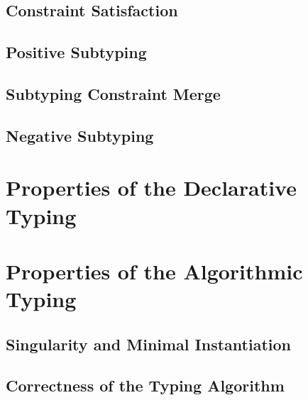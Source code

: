 \documentclass[acmsmall,natbib=false,review,anonymous]{acmart}
\newcommand{\genDir}{_gen}
\begin{document}
\subsection{Constraint Satisfaction}


\subsection{Positive Subtyping}


\subsection{Subtyping Constraint Merge}


\subsection{Negative Subtyping}




\section{Properties of the Declarative Typing}




\section{Properties of the Algorithmic Typing}

\subsection{Singularity and Minimal Instantiation}


\subsection{Correctness of the Typing Algorithm}


\printbibliography
\end{document}

